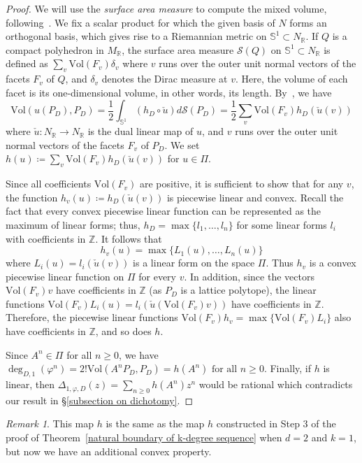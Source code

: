 \documentclass[11pt,a4paper]{article}
\theoremstyle{plain}
\theoremstyle{remark}
\newtheorem{remark}[theorem]{Remark}
\theoremstyle{custombold}
\begin{document}
\begin{proof}
    We will use the \emph{surface area measure} to compute the mixed volume, following~\cite{Schneider-book-2013}. We fix a scalar product for which the given basis of $N$ forms an orthogonal basis, which gives rise to a Riemannian metric on $\mathbb S^1\subset N_\mathbb R$. If $Q$ is a compact polyhedron in $M_\mathbb R$, the surface area measure $\mathcal{S}(Q)$ on $\mathbb S^1\subset N_\mathbb R$ is defined as $\sum_{v}\mathrm{Vol}(F_v)\delta_v$ where $v$ runs over the outer unit normal vectors of the facets $F_v$ of $Q$, and $\delta_v$ denotes the Dirac measure at $v$. Here, the volume of each facet is its one-dimensional volume, in other words, its length. By~\cite[Formulae~(5.19) and~(5.23)]{Schneider-book-2013}, we have
    $$\mathrm{Vol}(u(P_D),P_D)=\frac{1}{2}\int_{\mathbb S^1}(h_D \circ \check{u}) d\mathcal{S}(P_D)=\frac{1}{2}\sum_{v}\mathrm{Vol}(F_v)h_D(\check{u}(v))$$where $\check{u}\colon N_\mathbb R\rightarrow N_\mathbb R$ is the dual linear map of $u$, and $v$ runs over the outer unit normal vectors of the facets $F_v$ of $P_D$. We set $h(u)\coloneqq \sum_{v}\mathrm{Vol}(F_v)h_D(\check{u}(v))$ for $u\in \Pi$. 

Since all coefficients $\mathrm{Vol}(F_v)$ are positive, it is sufficient to show that for any $v$, the function $h_v(u)\coloneqq h_D(\check{u}(v))$ is piecewise linear and convex. Recall the fact that every convex piecewise linear function can be represented as the maximum of linear forms; thus, $h_D=\max\{l_1,\ldots,l_n\}$ for some linear forms $l_i$ with coefficients in $\mathbb Z$. It follows that $$h_v(u)=\max\{L_1(u),\ldots,L_n(u)\}$$ where $L_i(u)=l_i(\check{u}(v))$ is a linear form on the space $\Pi$. Thus $h_v$ is a convex piecewise linear function on $\Pi$ for every $v$. In addition, since the vectors $\mathrm{Vol}(F_v)v$ have coefficients in $\mathbb Z$ (as $P_D$ is a lattice polytope), the linear functions $\mathrm{Vol}(F_v)L_i(u)=l_i(\check{u}(\mathrm{Vol}(F_v)v))$ have coefficients in $\mathbb Z$. Therefore,
the piecewise linear functions $\mathrm{Vol}(F_v)h_v=\max\{\mathrm{Vol}(F_v)L_i\}$ also have coefficients in $\mathbb Z$, and so does $h$.

Since  $A^n\in\Pi$ for all $n\geq0$, we have
$\deg_{D,1}(\varphi^n)=2!\mathrm{Vol}(A^nP_D,P_D)=h(A^n)\text{ for all }n\geq0.$ Finally, if $h$ is linear, then $\Delta_{1,\varphi,D}(z)=\sum_{n\geq0}h(A^n)z^n$ would be rational which contradicts our result in \S\ref{subsection on dichotomy}.
\end{proof}
\begin{remark}
    This map $h$ is the same as the map $h$ constructed in Step 3 of the proof of Theorem~\ref{natural boundary of k-degree sequence} when $d=2$ and $k=1$, but now we have an additional convex property.
\end{remark}
\end{document}
